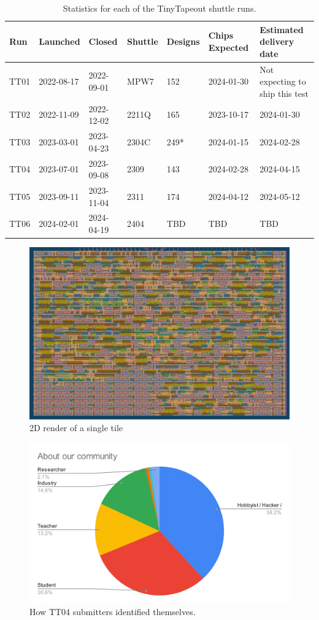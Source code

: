 \begin{table}[htbp]
\centering
\caption{Statistics for each of the TinyTapeout shuttle runs.}
\label{tab:tinytapeout}
\begin{tabularx}{\textwidth}{@{}l *{6}{X}@{}}
\toprule
\textbf{Run} & \textbf{Launched} & \textbf{Closed} & \textbf{Shuttle} & \textbf{Designs} & \textbf{Chips Expected} & \textbf{Estimated delivery date} \\
\midrule
TT01 & 2022-08-17 & 2022-09-01 & MPW7  & 152 & 2024-01-30 & Not expecting to ship this test \\
TT02 & 2022-11-09 & 2022-12-02 & 2211Q & 165 & 2023-10-17 & 2024-01-30 \\
TT03 & 2023-03-01 & 2023-04-23 & 2304C & 249* & 2024-01-15 & 2024-02-28 \\
TT04 & 2023-07-01 & 2023-09-08 & 2309  & 143 & 2024-02-28 & 2024-04-15 \\
TT05 & 2023-09-11 & 2023-11-04 & 2311  & 174 & 2024-04-12 & 2024-05-12 \\
TT06 & 2024-02-01 & 2024-04-19 & 2404  & TBD & TBD        & TBD \\
\bottomrule
\end{tabularx}
\end{table}

\begin{figure}[htp]
\centering
\includegraphics[width=\columnwidth]{./Figs/gh action gds layout.png}
\caption{2D render of a single tile}
\label{fig:render_cells_in_use}
\end{figure}

\begin{figure}[htp]
\centering
\includegraphics[width=\columnwidth]{./Figs/about our community pie chart.png}
\caption{How TT04 submitters identified themselves.}
\label{fig:TT04_submitters}
\end{figure}
